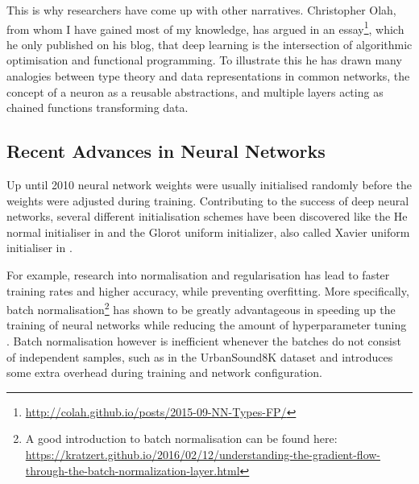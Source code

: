 This is why researchers have come up with other narratives. Christopher Olah, from whom I have gained most of my knowledge, has argued in an essay\footnote{\url{http://colah.github.io/posts/2015-09-NN-Types-FP/}}, which he only published on his blog, that deep learning is the intersection of algorithmic optimisation and functional programming. To illustrate this he has drawn many analogies between type theory and data representations in common networks, the concept of a neuron as a reusable abstractions, and multiple layers acting as chained functions transforming data. 


\subsection{Recent Advances in Neural Networks}

Up until 2010 neural network weights were usually initialised randomly before the weights were adjusted during training.  Contributing to the success of deep neural networks, several different initialisation schemes have been discovered like the He normal initialiser in \cite{DBLP:journals/corr/HeZR015} and the Glorot uniform initializer, also called Xavier uniform initialiser in \cite{pmlr-v9-glorot10a}.

For example, research into normalisation and regularisation has lead to faster training rates and higher accuracy, while preventing overfitting.  More specifically, batch normalisation\footnote{A good introduction to batch normalisation can be found here: \url{https://kratzert.github.io/2016/02/12/understanding-the-gradient-flow-through-the-batch-normalization-layer.html}} has shown to be greatly advantageous in speeding up the training of neural networks while reducing the amount of hyperparameter tuning \cite{DBLP:journals/corr/IoffeS15}. Batch normalisation however is inefficient whenever the batches do not consist of independent samples, such as in the UrbanSound8K dataset and introduces some extra overhead during training and network configuration.


